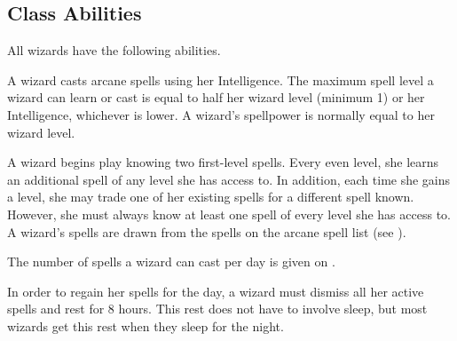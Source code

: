    \subsection{Class Abilities}
        All wizards have the following abilities.

        A wizard casts arcane spells using her Intelligence.
        The maximum spell level a wizard can learn or cast is equal to half her wizard level (minimum 1) or her Intelligence, whichever is lower.
        A wizard's spellpower is normally equal to her wizard level.

        A wizard begins play knowing two first-level spells.
        Every even level, she learns an additional spell of any level she has access to.
        In addition, each time she gains a level, she may trade one of her existing spells for a different spell known.
        However, she must always know at least one spell of every level she has access to.
        A wizard's spells are drawn from the spells on the arcane spell list (see ).

        The number of spells a wizard can cast per day is given on .

        In order to regain her spells for the day, a wizard must dismiss all her active spells and rest for 8 hours.
        This rest does not have to involve sleep, but most wizards get this rest when they sleep for the night.

